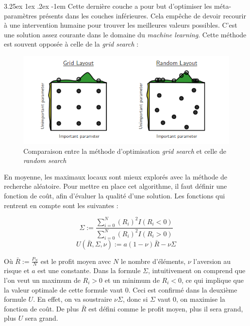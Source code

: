 \documentclass[a4paper, 11pt]{article}
\makeatletter
\renewcommand\paragraph{\@startsection{paragraph}{5}{\z@}%
  {3.25ex \@plus1ex \@minus.2ex}%
  {-1em}%
  {\normalfont\normalsize\bfseries}}
\makeatother
\begin{document}
\paragraph{}
Cette dernière couche a pour but d'optimiser les méta-paramètres présents dans les couches inférieures. Cela empêche de devoir recourir à une intervention
humaine pour trouver les meilleures valeurs possibles. C'est une solution assez courante dans le domaine du \textit{machine learning}\cite{automated_hyperparamters}. Cette méthode est
souvent opposée à celle de la \textit{grid search} \cite{grid_vs_random}:
\begin{figure}[H]
\centering
\includegraphics[scale=0.75]{images/grid_vs_random}
\caption{Comparaison entre la méthode d'optimisation \textit{grid search} et celle de \textit{random search}}
\end{figure}

En moyenne, les maximaux locaux sont mieux explorés avec la méthode de recherche aléatoire. Pour mettre en place cet algorithme, il faut définir une
fonction de coût, afin d'évaluer la qualité d'une solution.
Les fonctions qui rentrent en compte sont les suivantes :
\begin{center}
 $$ \Sigma := \frac{\sum_{i=0}^N (R_i)^2 I (R_i < 0)}{\sum_{i=0}^N (R_i)^2 I (R_i > 0)}$$
 $$ U(\bar{R}, \Sigma, \nu) := a (1 - \nu) \bar{R} - \nu \Sigma$$
\end{center}

Où $\bar{R} := \frac{P_N}{N}$ est le profit moyen avec $N$ le nombre d'éléments, $\nu$ l'aversion au risque et $a$ est une constante.
Dans la formule $\Sigma$, intuitivement on comprend que l'on veut un maximum de $R_i > 0$ et un minimum de $R_i < 0$, ce qui implique que la valeur
optimale de cette formule vaut $0$. Ceci est confirmé dans la deuxième formule $U$. En effet, on va soustraire $\nu \Sigma$, donc si $\Sigma$ vaut $0$,
on maximise la fonction de coût. De plus $\bar{R}$ est défini comme le profit moyen, plus il sera grand, plus $U$ sera grand.
\end{document}
